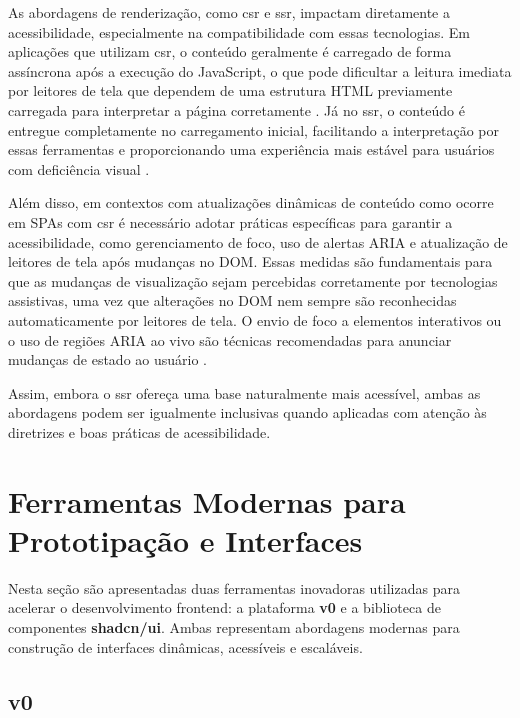 As abordagens de renderização, como \acrshort{csr} e \acrshort{ssr}, impactam diretamente a acessibilidade, especialmente na compatibilidade com essas tecnologias. Em aplicações que utilizam \acrshort{csr}, o conteúdo geralmente é carregado de forma assíncrona após a execução do JavaScript, o que pode dificultar a leitura imediata por leitores de tela que dependem de uma estrutura HTML previamente carregada para interpretar a página corretamente \cite{pixelfree2023access}. Já no \acrshort{ssr}, o conteúdo é entregue completamente no carregamento inicial, facilitando a interpretação por essas ferramentas e proporcionando uma experiência mais estável para usuários com deficiência visual \cite{atori2024}.

Além disso, em contextos com atualizações dinâmicas de conteúdo como ocorre em SPAs com \acrshort{csr} é necessário adotar práticas específicas para garantir a acessibilidade, como gerenciamento de foco, uso de alertas ARIA e atualização de leitores de tela após mudanças no DOM. Essas medidas são fundamentais para que as mudanças de visualização sejam percebidas corretamente por tecnologias assistivas, uma vez que alterações no DOM nem sempre são reconhecidas automaticamente por leitores de tela. O envio de foco a elementos interativos ou o uso de regiões ARIA ao vivo são técnicas recomendadas para anunciar mudanças de estado ao usuário \cite{sutton2018}.

Assim, embora o \acrshort{ssr} ofereça uma base naturalmente mais acessível, ambas as abordagens podem ser igualmente inclusivas quando aplicadas com atenção às diretrizes e boas práticas de acessibilidade.



\section{Ferramentas Modernas para Prototipação e Interfaces}
\label{sec:ferramentas-modernas}

Nesta seção são apresentadas duas ferramentas inovadoras utilizadas para acelerar o desenvolvimento frontend: a plataforma \textbf{v0} e a biblioteca de componentes \textbf{shadcn/ui}. Ambas representam abordagens modernas para construção de interfaces dinâmicas, acessíveis e escaláveis.

\subsection{v0}
\label{subsec:v0}

